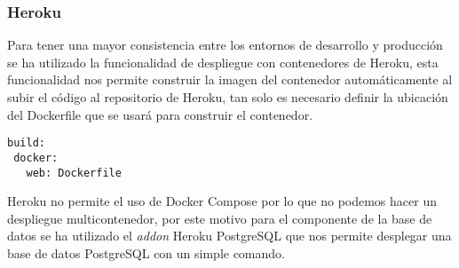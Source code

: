 \documentclass[../proyecto.tex]{subfiles}
\begin{document}
\subsubsection{Heroku}

Para tener una mayor consistencia entre los entornos de desarrollo y producción se ha utilizado la funcionalidad de despliegue con contenedores de Heroku, esta funcionalidad nos permite construir la imagen del contenedor automáticamente al subir el código al repositorio de Heroku, tan solo es necesario definir la ubicación del Dockerfile que se usará para construir el contenedor.\\

\begin{minipage}{\linewidth}
\begin{lstlisting}[caption=Definición de aplicación de Heroku, captionpos=b, frame=single]
build:
 docker:
   web: Dockerfile
\end{lstlisting}
\end{minipage}

Heroku no permite el uso de Docker Compose por lo que no podemos hacer un despliegue multicontenedor, por este motivo para el componente de la base de datos se ha utilizado el \textit{addon} Heroku PostgreSQL que nos permite desplegar una base de datos PostgreSQL con un simple comando.\\
\end{document}
